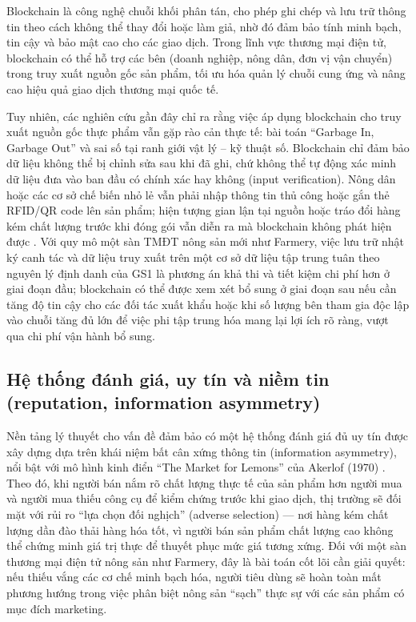 Blockchain là công nghệ chuỗi khối phân tán, cho phép ghi chép và lưu trữ thông tin theo cách không thể thay đổi hoặc làm giả, nhờ đó đảm bảo tính minh bạch, tin cậy và bảo mật cao cho các giao dịch. Trong lĩnh vực thương mại điện tử, blockchain có thể hỗ trợ các bên (doanh nghiệp, nông dân, đơn vị vận chuyển) trong truy xuất nguồn gốc sản phẩm, tối ưu hóa quản lý chuỗi cung ứng và nâng cao hiệu quả giao dịch thương mại quốc tế.

Tuy nhiên, các nghiên cứu gần đây chỉ ra rằng việc áp dụng blockchain cho truy xuất nguồn gốc thực phẩm vẫn gặp rào cản thực tế: bài toán ``Garbage In, Garbage Out'' và sai số tại ranh giới vật lý -- kỹ thuật số. Blockchain chỉ đảm bảo dữ liệu không thể bị chỉnh sửa sau khi đã ghi, chứ không thể tự động xác minh dữ liệu đưa vào ban đầu có chính xác hay không (input verification). Nông dân hoặc các cơ sở chế biến nhỏ lẻ vẫn phải nhập thông tin thủ công hoặc gắn thẻ RFID/QR code lên sản phẩm; hiện tượng gian lận tại nguồn hoặc tráo đổi hàng kém chất lượng trước khi đóng gói vẫn diễn ra mà blockchain không phát hiện được \cite{bath_blockchain}. Với quy mô một sàn TMĐT nông sản mới như Farmery, việc lưu trữ nhật ký canh tác và dữ liệu truy xuất trên một cơ sở dữ liệu tập trung tuân theo nguyên lý định danh của GS1 là phương án khả thi và tiết kiệm chi phí hơn ở giai đoạn đầu; blockchain có thể được xem xét bổ sung ở giai đoạn sau nếu cần tăng độ tin cậy cho các đối tác xuất khẩu hoặc khi số lượng bên tham gia độc lập vào chuỗi tăng đủ lớn để việc phi tập trung hóa mang lại lợi ích rõ ràng, vượt qua chi phí vận hành bổ sung.

\subsection{Hệ thống đánh giá, uy tín và niềm tin (reputation, information asymmetry)}
\label{subsec:reputation}

Nền tảng lý thuyết cho vấn đề đảm bảo có một hệ thống đánh giá đủ uy tín được xây dựng dựa trên khái niệm bất cân xứng thông tin (information asymmetry), nổi bật với mô hình kinh điển ``The Market for Lemons'' của Akerlof (1970) \cite{akerlof1970lemons}. Theo đó, khi người bán nắm rõ chất lượng thực tế của sản phẩm hơn người mua và người mua thiếu công cụ để kiểm chứng trước khi giao dịch, thị trường sẽ đối mặt với rủi ro ``lựa chọn đối nghịch'' (adverse selection) --- nơi hàng kém chất lượng dần đào thải hàng hóa tốt, vì người bán sản phẩm chất lượng cao không thể chứng minh giá trị thực để thuyết phục mức giá tương xứng. Đối với một sàn thương mại điện tử nông sản như Farmery, đây là bài toán cốt lõi cần giải quyết: nếu thiếu vắng các cơ chế minh bạch hóa, người tiêu dùng sẽ hoàn toàn mất phương hướng trong việc phân biệt nông sản ``sạch'' thực sự với các sản phẩm có mục đích marketing.

